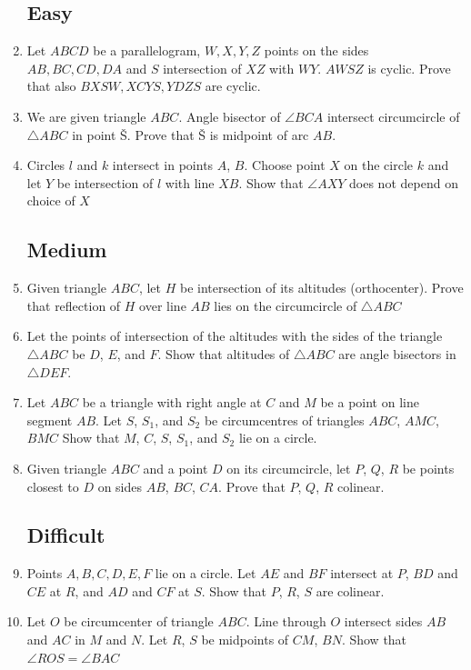 \documentclass[11pt,a5paper]{article}
\begin{document}
\begin{enumerate}
	\subsection*{Easy}

\item{Let $ABCD$ be a parallelogram, $W, X, Y, Z$ points on the sides \\ $AB, BC, CD, DA$ and $S$ intersection of $XZ$ with $WY$. $AWSZ$ is cyclic. Prove that also $BXSW, XCYS, YDZS$ are cyclic.}

	\item{We are given triangle $ABC$. Angle bisector of $\angle BCA$} intersect circumcircle of $\triangle ABC$ in point \v{S}. Prove that \v{S} is midpoint of arc $AB$.
	
	\item{Circles $l$ and $k$ intersect in points $A$, $B$. Choose point $X$ on the circle $k$ and let $Y$ be intersection of $l$ with line $XB$. Show that $\angle AXY$ does not depend on choice of $X$}

	\subsection*{Medium}
	
	\item{Given triangle $ABC$, let $H$ be intersection of its altitudes (orthocenter). Prove that reflection of $H$ over line $AB$ lies on the circumcircle of $\triangle ABC$}	
	
	\item{Let the points of intersection of the altitudes with the sides of the triangle $\triangle ABC$ be $D$, $E$, and $F$. Show that altitudes of $\triangle ABC$ are angle bisectors in $\triangle DEF$.}
	
	\item{Let $ABC$ be a triangle with right angle at $C$ and $M$ be a point on line segment $AB$. Let $S$, $S_1$, and $S_2$ be circumcentres of triangles $ABC$, $ AMC$, $BMC$ Show that $M$, $C$, $S$, $S_1$, and $S_2$ lie on a circle. }
		
	\item{Given triangle $ABC$ and a point $D$ on its circumcircle, let $P$, $Q$, $R$ be points closest to $D$ on sides $AB$, $BC$, $CA$. Prove that $P$, $Q$, $R$ colinear.}
	
	
	
\subsection*{Difficult}
	
	\item{Points $A, B, C, D, E, F$ lie on a circle. Let $AE$ and $BF$ intersect at $P$, $BD$ and $CE$ at $R$, and $AD$ and $CF$ at $S$. Show that $P$, $R$, $S$ are colinear.}
	
	\item{Let $O$ be circumcenter of triangle $ABC$. Line through $O$ intersect sides $AB$ and $AC$ in $M$ and $N$. Let $R$, $S$ be midpoints of $CM$, $BN$. Show that $\angle ROS = \angle BAC$}

\end{enumerate}
\end{document}
